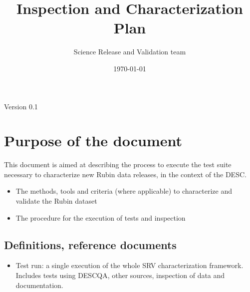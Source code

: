 \documentclass[12pt, a4paper]{article}
\title{Inspection and Characterization Plan} %
\author{Science Release and Validation team} %
\date{\today} %
\begin{document}
\maketitle %

\begin{center}
Version 0.1
\end{center}



\section{Purpose of the document}

This document is aimed at describing the process to execute the test suite necessary to characterize new Rubin data releases, in the context of the DESC.

\begin{itemize}
\item The methods, tools and criteria (where applicable) to characterize and validate the Rubin dataset
\item The procedure for the execution of tests and inspection
\end{itemize}


\subsection{Definitions, reference documents}

\begin{itemize}
\item Test run: a single execution of the whole SRV characterization framework. Includes tests using DESCQA, other sources, inspection of data and documentation.
\end{itemize}
 
\end{document}
